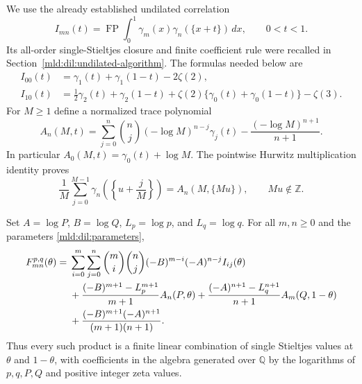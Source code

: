 We use the already established undilated correlation
\[
 I_{mn}(t)=\operatorname{FP}\int_0^1
                  \gamma_m(x)\gamma_n(\{x+t\})\,dx,
 \qquad 0<t<1.
\]
Its all-order single-Stieltjes closure and finite coefficient rule were
recalled in Section~\ref{mld:dil:undilated-algorithm}.  The formulas needed below are
\begin{align}
 I_{00}(t)&=\gamma_1(t)+\gamma_1(1-t)-2\zeta(2),
 \label{mld:dil:I00}\\
 I_{10}(t)&=\tfrac12\gamma_2(t)+\gamma_2(1-t)
        +\zeta(2)\{\gamma_0(t)+\gamma_0(1-t)\}-\zeta(3).
 \label{mld:dil:I10}
\end{align}
For $M\ge1$ define a normalized trace polynomial
\begin{equation}
 A_n(M,t)=\sum_{j=0}^n\binom nj(-\log M)^{n-j}\gamma_j(t)
                 -\frac{(-\log M)^{n+1}}{n+1}.
 \label{mld:dil:trace-polynomial}
\end{equation}
In particular $A_0(M,t)=\gamma_0(t)+\log M$.
The pointwise Hurwitz multiplication identity \cite[\S25.11]{DLMFhurwitz} proves
\[
 \frac1M\sum_{j=0}^{M-1}\gamma_n\!\left(\left\{u+\frac jM\right\}\right)
                     =A_n(M,\{Mu\}),\qquad Mu\notin\mathbb Z.
\]

\begin{theorem}
\label{mld:dil:full-stieltjes}
Set $A=\log P$, $B=\log Q$, $L_p=\log p$, and $L_q=\log q$.
For all $m,n\ge0$ and the parameters \eqref{mld:dil:parameters},
\begin{align}
 F_{mn}^{p,q}(\theta)={}&
 \sum_{i=0}^m\sum_{j=0}^n\binom mi\binom nj
             (-B)^{m-i}(-A)^{n-j}I_{ij}(\theta)\notag\\
 &+\frac{(-B)^{m+1}-L_p^{m+1}}{m+1}A_n(P,\theta)
  +\frac{(-A)^{n+1}-L_q^{n+1}}{n+1}A_m(Q,1-\theta)\notag\\
 &+\frac{(-B)^{m+1}(-A)^{n+1}}{(m+1)(n+1)}.
 \label{mld:dil:full-formula}
\end{align}
Thus every such product is a finite linear combination of single
Stieltjes values at $\theta$ and $1-\theta$, with coefficients in the
algebra generated over $\mathbb Q$ by the logarithms of $p,q,P,Q$ and
positive integer zeta values.
\end{theorem}

